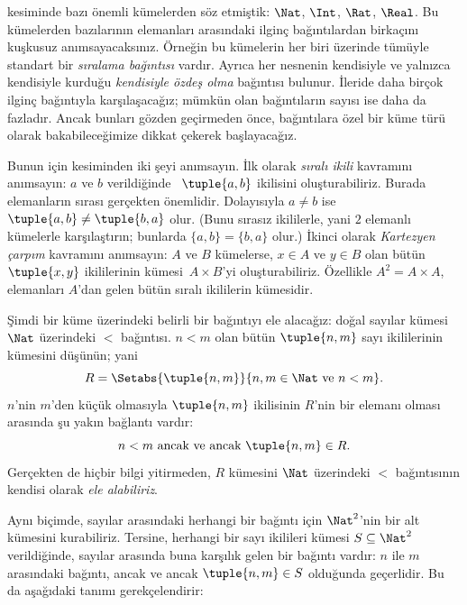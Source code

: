 \documentclass[../../../include/open-logic-section]{subfiles}
\begin{document}

\begin{explain}
 kesiminde bazı önemli kümelerden söz etmiştik:
$\Nat$, $\Int$, $\Rat$, $\Real$. Bu kümelerden bazılarının elemanları arasındaki
ilginç bağıntılardan birkaçını kuşkusuz anımsayacaksınız. Örneğin bu kümelerin
her biri üzerinde tümüyle standart bir \emph{sıralama bağıntısı} vardır. Ayrıca
her nesnenin kendisiyle ve yalnızca kendisiyle kurduğu \emph{kendisiyle özdeş
olma} bağıntısı bulunur. İleride daha birçok ilginç bağıntıyla karşılaşacağız; mümkün olan
bağıntıların sayısı ise daha da fazladır. Ancak bunları gözden geçirmeden önce,
bağıntılara özel bir küme türü olarak bakabileceğimize dikkat çekerek
başlayacağız.

Bunun için  kesiminden iki şeyi anımsayın. İlk olarak
\emph{sıralı ikili} kavramını anımsayın: $a$ ve $b$ verildiğinde
~$\tuple{a, b}$ ikilisini oluşturabiliriz. Burada elemanların sırası gerçekten
önemlidir. Dolayısıyla $a \neq b$ ise $\tuple{a, b} \neq \tuple{b, a}$ olur.
(Bunu sırasız ikililerle, yani $2$ elemanlı kümelerle karşılaştırın; bunlarda
$\{a, b\}=\{b, a\}$ olur.) İkinci olarak \emph{Kartezyen çarpım} kavramını
anımsayın: $A$ ve $B$ kümelerse, $x \in A$ ve $y \in B$ olan bütün
$\tuple{x, y}$ ikililerinin kümesi~$A \times B$'yi oluşturabiliriz. Özellikle
$A^{2}= A \times A$, elemanları $A$'dan gelen bütün sıralı ikililerin kümesidir.

Şimdi bir küme üzerindeki belirli bir bağıntıyı ele alacağız: doğal sayılar
kümesi~$\Nat$ üzerindeki $<$ bağıntısı. $n<m$ olan bütün $\tuple{n, m}$ sayı
ikililerinin kümesini düşünün; yani
\[
  R=\Setabs{\tuple{n, m}}{n, m \in \Nat \text{ ve } n<m}.
\]
$n$'nin $m$'den küçük olmasıyla $\tuple{n, m}$ ikilisinin $R$'nin bir elemanı
olması arasında şu yakın bağlantı vardır:
\[
      n<m\text{ ancak ve ancak }\tuple{n, m} \in R.
\]
Gerçekten de hiçbir bilgi yitirmeden, $R$ kümesini $\Nat$ üzerindeki $<$
bağıntısının kendisi olarak \emph{ele alabiliriz}.

Aynı biçimde, sayılar arasındaki herhangi bir bağıntı için $\Nat^{2}$'nin bir
alt kümesini kurabiliriz. Tersine, herhangi bir sayı ikilileri kümesi
$S \subseteq \Nat^{2}$ verildiğinde, sayılar arasında buna karşılık gelen bir
bağıntı vardır: $n$ ile $m$ arasındaki bağıntı, ancak ve ancak
$\tuple{n, m} \in S$ olduğunda geçerlidir. Bu da aşağıdaki tanımı gerekçelendirir:
\end{explain}
\end{document}
